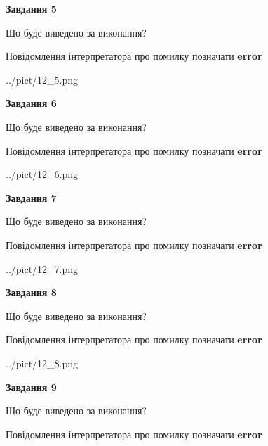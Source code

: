 \documentclass[11pt, ukrainian]{article}
\begin{document}
{\begin {large}
{\begin {center}\textbf{Завдання 5}\end {center}}\par
Що буде виведено за виконання? \par
Повідомлення інтерпретатора про помилку позначати \textbf{error}

\begin{center}
	{../pict/12_5.png}
\end{center}
\newpage

{\begin {center}\textbf{Завдання 6}\end {center}}\par
Що буде виведено за виконання? \par
Повідомлення інтерпретатора про помилку позначати \textbf{error}

\begin{center}
	{../pict/12_6.png}
\end{center}
\newpage

{\begin {center}\textbf{Завдання 7}\end {center}}\par
Що буде виведено за виконання? \par
Повідомлення інтерпретатора про помилку позначати \textbf{error}

\begin{center}
	{../pict/12_7.png}
\end{center}
\newpage

{\begin {center}\textbf{Завдання 8}\end {center}}\par
Що буде виведено за виконання? \par
Повідомлення інтерпретатора про помилку позначати \textbf{error}

\begin{center}
	{../pict/12_8.png}
\end{center}
\newpage

{\begin {center}\textbf{Завдання 9}\end {center}}\par
Що буде виведено за виконання? \par
Повідомлення інтерпретатора про помилку позначати \textbf{error}


\end{large}}
\end{document}
